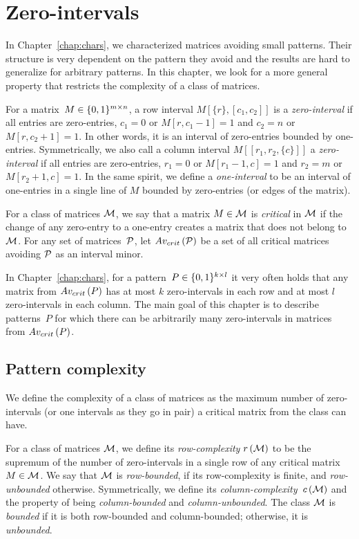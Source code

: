 \chapter{Zero-intervals}
\label{intervals}
In Chapter~\ref{chap:chars}, we characterized matrices avoiding small patterns. Their structure is very dependent on the pattern they avoid and the results are hard to generalize for arbitrary patterns. In this chapter, we look for a more general property that restricts the complexity of a class of matrices.

\begin{defn}
For a matrix~$M\in\{0,1\}^{m\times n}$, a row interval $M[\{r\},[c_1,c_2]]$ is a \emph{zero-interval} if all entries are zero-entries, $c_1=0$ or $M[r,c_1-1]=1$ and $c_2=n$ or $M[r,c_2+1]=1$. In other words, it is an interval of zero-entries bounded by one-entries. Symmetrically, we also call a column interval $M[[r_1,r_2,\{c\}]]$ a \emph{zero-interval} if all entries are zero-entries, $r_1=0$ or $M[r_1-1,c]=1$ and $r_2=m$ or $M[r_2+1,c]=1$. In the same spirit, we define a \emph{one-interval} to be an interval of one-entries in a single line of $M$ bounded by zero-entries (or edges of the matrix).
\end{defn}

\begin{defn}
For a class of matrices $\mathcal{M}$, we say that a matrix $M\in\mathcal{M}$ is \emph{critical} in $\mathcal{M}$ if the change of any zero-entry to a one-entry creates a matrix that does not belong to $\mathcal{M}$. For any set of matrices~$\mathcal{P}$, let $Av_{crit}\left(\mathcal{P}\right)$ be a set of all critical matrices avoiding $\mathcal{P}$ as an interval minor.
\end{defn}

In Chapter~\ref{chap:chars}, for a pattern~$P\in\{0,1\}^{k\times l}$ it very often holds that any matrix from $Av_{crit}\left(P\right)$ has at most $k$ zero-intervals in each row and at most $l$ zero-intervals in each column. The main goal of this chapter is to describe patterns~$P$ for which there can be arbitrarily many zero-intervals in matrices from $Av_{crit}\left(P\right)$.

\section{Pattern complexity}
We define the complexity of a class of matrices as the maximum number of zero-intervals (or one intervals as they go in pair) a critical matrix from the class can have.

\begin{defn}
For a class of matrices $\mathcal{M}$, we define its \emph{row-complexity} $r\left(\mathcal{M}\right)$ to be the supremum of the number of zero-intervals in a single row of any critical matrix~$M\in\mathcal{M}$. We say that $\mathcal{M}$ is \emph{row-bounded}, if its row-complexity is finite, and \emph{row-unbounded} otherwise. Symmetrically, we define its \emph{column-complexity}~$c\left(\mathcal{M}\right)$ and the property of being \emph{column-bounded} and \emph{column-unbounded}. The class $\mathcal{M}$ is \emph{bounded} if it is both row-bounded and column-bounded; otherwise, it is \emph{unbounded}.
\end{defn}

